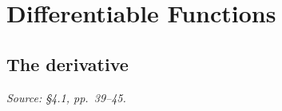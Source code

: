 
\section{Differentiable Functions}

\subsection{The derivative}
\textit{Source: \S4.1, pp.~39--45.}

